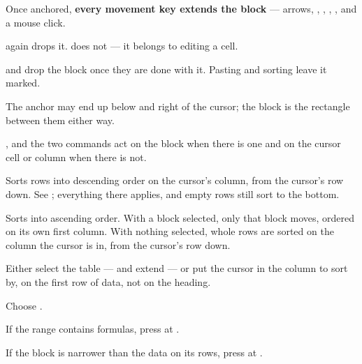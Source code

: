 \begin{ccsteps}
\item Once anchored, \textbf{every movement key extends the block} --- arrows,
, , , , and a mouse click.
\item {} again drops it.  does not --- it belongs to
editing a cell.
\item {} and  drop the block once they are done
with it. Pasting and sorting leave it marked.
\item The anchor may end up below and right of the cursor; the block is the
rectangle between them either way.
\item {},  and the two  commands
act on the block when there is one and on the cursor cell or column when there
is not.
\end{ccsteps}


Sorts rows into descending order on the cursor's column, from the cursor's row
down. See ; everything there applies, and empty rows still
sort to the bottom.


Sorts into ascending order. With a block selected, only that block moves,
ordered on its own first column. With nothing selected, whole rows are sorted
on the column the cursor is in, from the cursor's row down.

\begin{ccprocedure}[]
\item Either select the table ---  and extend --- or put the
cursor in the column to sort by, on the first row of data, not on the heading.
\item Choose .
\item If the range contains formulas, press  at
.
\item If the block is narrower than the data on its rows, press  at
.
\end{ccprocedure}

